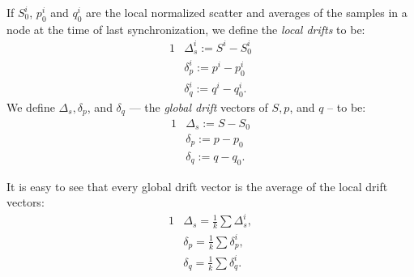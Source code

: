 If $S_0^i$, $p_0^i$ and $q_0^i$ are the local normalized scatter and averages
of the samples in a node at the time of last synchronization, we define the \textit{local drifts} to be:
\begin{alignat*}{1}
& \Delta_s^i:= S^i - S_0^i
\\ & \delta_p^i:= p^i - p_0^i
\\ & \delta_q^i:= q^i - q_0^i.
\end{alignat*}
We define $\Delta_s, \delta_p$, and $\delta_q$ --- the \textit{global drift} vectors of $S, p$, and $q$ -- to be:
\begin{alignat*}{1}
& \Delta_s:= S - S_0 \\
& \delta_p:= p - p_0 \\
& \delta_q := q - q_0.
\end{alignat*}

\begin{remark} \label{average}
It is easy to see that every global drift vector is the average of the local drift vectors:
\begin{alignat*}{1}
& \Delta_s = \frac{1}{k} \sum \Delta_s^i, \\
& \delta_p = \frac{1}{k} \sum \delta_p^i, \\
& \delta_q = \frac{1}{k} \sum \delta_q^i.
\end{alignat*}

\end{remark}

